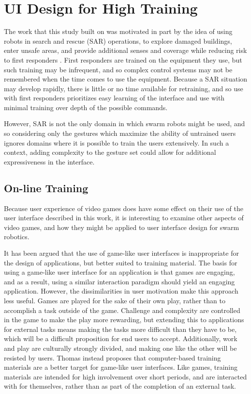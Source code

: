 \chapter{UI Design for High Training}
\thispagestyle{fancy}

The work that this study built on was motivated in part by the idea of using robots in search and rescue (SAR) operations, to explore damaged buildings, enter unsafe areas, and provide additional senses and coverage while reducing risk to first responders \citep{micire2010multi}.
First responders are trained on the equipment they use, but such training may be infrequent, and so complex control systems may not be remembered when the time comes to use the equipment. 
Because a SAR situation may develop rapidly, there is little or no time available for retraining, and so use with first responders prioritizes easy learning of the interface and use with minimal training over depth of the possible commands.  

However, SAR is not the only domain in which swarm robots might be used, and so considering only the gestures which maximize the ability of untrained users ignores domains where it is possible to train the users extensively. 
In such a context, adding complexity to the gesture set could allow for additional expressiveness in the interface.


\section{On-line Training}

Because user experience of video games does have some effect on their use of the user interface described in this work, it is interesting to examine other aspects of video games, and how they might be applied to user interface design for swarm robotics. 

It has been argued that the use of game-like user interfaces is inappropriate for the design of applications, but better suited to training material\citep{thomas1994games}. The basis for using a game-like user interface for an application is that games are engaging, and as a result, using a similar interaction paradigm should yield an engaging application. 
However, the dissimilarities in user motivation make this approach less useful. 
Games are played for the sake of their own play, rather than to accomplish a task outside of the game. 
Challenge and complexity are controlled in the game to make the play more rewarding, but extending this to applications for external tasks means making the tasks more difficult than they have to be, which will be a difficult proposition for end users to accept. 
Additionally, work and play are culturally strongly divided, and making one like the other will be resisted by users. 
Thomas instead proposes that computer-based training materials are a better target for game-like user interfaces. 
Like games, training materials are intended for high involvement over short periods, and are interacted with for themselves, rather than as part of the completion of an external task. 

